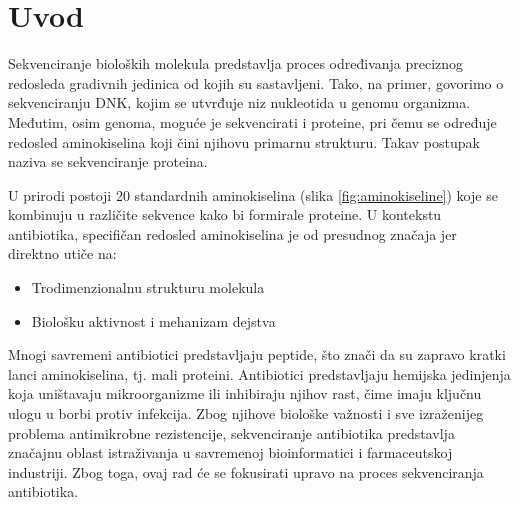 \documentclass[12pt,oneside]{memoir}
\begin{document}

\frontmatter
\naslovna
\komisija
{}
\apstrakt
\tableofcontents*

\mainmatter

\chapter{Uvod}
Sekvenciranje bioloških molekula predstavlja proces određivanja preciznog redosleda gradivnih jedinica od kojih su sastavljeni. Tako, na primer, govorimo o sekvenciranju DNK, kojim se utvrđuje niz nukleotida u genomu organizma. Međutim, osim genoma, moguće je sekvencirati i proteine, pri čemu se određuje redosled aminokiselina koji čini njihovu primarnu strukturu. Takav postupak naziva se sekvenciranje proteina.

U prirodi postoji 20 standardnih aminokiselina (slika \ref{fig:aminokiseline}) koje se kombinuju u različite sekvence kako bi formirale proteine. U kontekstu antibiotika, specifičan redosled aminokiselina je od presudnog značaja jer direktno utiče na:

\begin{itemize}
    \item Trodimenzionalnu strukturu molekula
    \item Biološku aktivnost i mehanizam dejstva
\end{itemize}

Mnogi savremeni antibiotici predstavljaju peptide, što znači da su zapravo kratki lanci aminokiselina, tj. mali proteini. Antibiotici predstavljaju hemijska jedinjenja koja uništavaju mikroorganizme ili inhibiraju njihov rast, čime imaju ključnu ulogu u borbi protiv infekcija. Zbog njihove biološke važnosti i sve izraženijeg problema antimikrobne rezistencije, sekvenciranje antibiotika predstavlja značajnu oblast istraživanja u savremenoj bioinformatici i farmaceutskoj industriji. Zbog toga, ovaj rad će se fokusirati upravo na proces sekvenciranja antibiotika.
\end{document}
